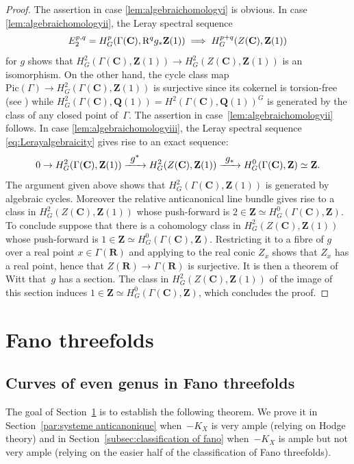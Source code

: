 \documentclass[JEP,XML,SOM,Unicode]{cedram}
\newcommand\implique{\mathchoice{\implies}{\Rightarrow}{\Rightarrow}{\Rightarrow}}
\newcommand{\To}[1]{\mathchoice{\xrightarrow{\textstyle\kern4pt#1\kern3pt}}{\stackrel{#1}{\longrightarrow}}{}{}}
\theoremstyle{plain}
\theoremstyle{definition}
\numberwithin{equation}{section}
\renewcommand{\C}{{\mathbf C}}
\newcommand{\Q}{{\mathbf Q}}
\newcommand{\R}{{\mathbf R}}
\newcommand{\Z}{{\mathbf Z}}
\newcommand{\Pic}{\mathrm{Pic}}
\newcommand{\RR}{{\mathrm{R}}}
\begin{document}
\begin{proof}
The assertion in case \eqref{lem:algebraichomologyi} is obvious.
In case \eqref{lem:algebraichomologyii}, the Leray spectral sequence
\begin{equation}
\label{eq:Lerayalgebraicity}
E_2^{p,q}=H^p_G(\Gamma(\C),\RR^qg_*\Z(1))\implique H^{p+q}_G(Z(\C),\Z(1))
\end{equation}
for $g$ shows that $H^2_G(\Gamma(\C),\Z(1))\to H^2_G(Z(\C),\Z(1))$ is an isomorphism.
On the other hand, the cycle class map
$\Pic(\Gamma) \to H^2_G(\Gamma(\C),\Z(1))$
is surjective since its cokernel is torsion-free
(see \cite[Prop.\,\ref*{BW1-prop:real(1,1)nonarch}]{BW1})
while $H^2_G(\Gamma(\C),\Q(1))=H^2(\Gamma(\C),\Q(1))^G$
is generated by the class of any closed point of~$\Gamma$.
The assertion in case~\eqref{lem:algebraichomologyii} follows.
In case \eqref{lem:algebraichomologyiii}, the Leray spectral sequence \eqref{eq:Lerayalgebraicity} gives rise to an exact sequence:
\[
0\to H^2_G(\Gamma(\C),\Z(1))\To{g^*} H^2_G(Z(\C),\Z(1))\To{g_*} H^0_G(\Gamma(\C),\Z)\simeq \Z.
\]
The argument given above shows that $H^2_G(\Gamma(\C),\Z(1))$ is generated by algebraic cycles. Moreover the relative anticanonical line bundle gives rise to a class in $H^2_G(Z(\C),\Z(1))$ whose push-forward is $2\in\Z\simeq H^0_G(\Gamma(\C),\Z)$. To conclude suppose that there is a cohomology class in $H^2_G(Z(\C),\Z(1))$ whose push-forward is $1\in\Z\simeq H^0_G(\Gamma(\C),\Z)$. Restricting it to a fibre of $g$ over a real point $x\in \Gamma(\R)$ and applying \cite[Prop.\,\ref*{BW1-prop:real(1,1)nonarch}]{BW1} to the real conic $Z_x$ shows that $Z_x$ has a real point, hence that $Z(\R)\to \Gamma(\R)$ is surjective. It is then a theorem of Witt \cite[Satz~22]{WittHasse} that~$g$ has a section. The class in $H^2_G(Z(\C),\Z(1))$ of the image of this section induces $1\in\Z\simeq H^0_G(\Gamma(\C),\Z)$, which concludes the proof.
\end{proof}

\section{Fano threefolds}
\label{sec:Fano}

\subsection{Curves of even genus in Fano threefolds}

The goal of Section~\ref{sec:Fano} is to establish the following theorem.
We prove it in Section~\ref{par:systeme anticanonique}
when~$-K_X$ is very ample (relying on Hodge theory)
and in Section~\ref{subsec:classification of fano}
when~$-K_X$ is ample but not very ample (relying on the easier half of the classification of Fano threefolds).
\end{document}

